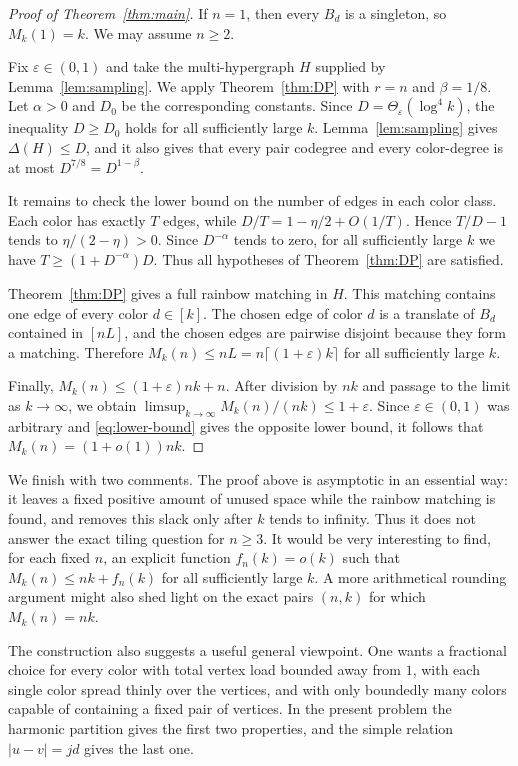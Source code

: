 \documentclass[twoside,12pt]{article}
\numberwithin{equation}{section}
\newcommand{\eps}{\varepsilon}
\begin{document}
\begin{proof}[Proof of Theorem~\ref{thm:main}]
If $n=1$, then every $B_d$ is a singleton, so $M_k(1)=k$.  We may assume
$n\ge2$.

Fix $\eps\in(0,1)$ and take the multi-hypergraph $H$ supplied by
Lemma~\ref{lem:sampling}.  We apply Theorem~\ref{thm:DP} with $r=n$ and
$\beta=1/8$.  Let $\alpha>0$ and $D_0$ be the corresponding constants.  Since
$D=\Theta_\eps(\log^4 k)$, the inequality $D\ge D_0$ holds for all sufficiently
large $k$.  Lemma~\ref{lem:sampling} gives $\Delta(H)\le D$, and it also gives
that every pair codegree and every color-degree is at most
$D^{7/8}=D^{1-\beta}$.

It remains to check the lower bound on the number of edges in each color
class.  Each color has exactly $T$ edges, while
$D/T=1-\eta/2+O(1/T)$.  Hence $T/D-1$ tends to $\eta/(2-\eta)>0$.  Since
$D^{-\alpha}$ tends to zero, for all sufficiently large $k$ we have
$T\ge(1+D^{-\alpha})D$.  Thus all hypotheses of Theorem~\ref{thm:DP} are
satisfied.

Theorem~\ref{thm:DP} gives a full rainbow matching in $H$.  This matching
contains one edge of every color $d\in[k]$.  The chosen edge of color $d$ is a
translate of $B_d$ contained in $[nL]$, and the chosen edges are pairwise
disjoint because they form a matching.  Therefore
$M_k(n)\le nL=n\lceil(1+\eps)k\rceil$ for all sufficiently large $k$.

Finally, $M_k(n)\le(1+\eps)nk+n$.  After division by $nk$ and passage to the
limit as $k\to\infty$, we obtain
$\limsup_{k\to\infty}M_k(n)/(nk)\le1+\eps$.  Since $\eps\in(0,1)$ was
arbitrary and \eqref{eq:lower-bound} gives the opposite lower bound, it follows
that $M_k(n)=(1+o(1))nk$.
\end{proof}

We finish with two comments.  The proof above is asymptotic in an essential
way: it leaves a fixed positive amount of unused space while the rainbow
matching is found, and removes this slack only after $k$ tends to infinity.
Thus it does not answer the exact tiling question for $n\ge3$.  It would be
very interesting to find, for each fixed $n$, an explicit function
$f_n(k)=o(k)$ such that $M_k(n)\le nk+f_n(k)$ for all sufficiently large $k$.
A more arithmetical rounding argument might also shed light on the exact pairs
$(n,k)$ for which $M_k(n)=nk$.

The construction also suggests a useful general viewpoint.  One wants a
fractional choice for every color with total vertex load bounded away from
$1$, with each single color spread thinly over the vertices, and with only
boundedly many colors capable of containing a fixed pair of vertices.  In the
present problem the harmonic partition gives the first two properties, and the
simple relation $|u-v|=jd$ gives the last one.
\end{document}
